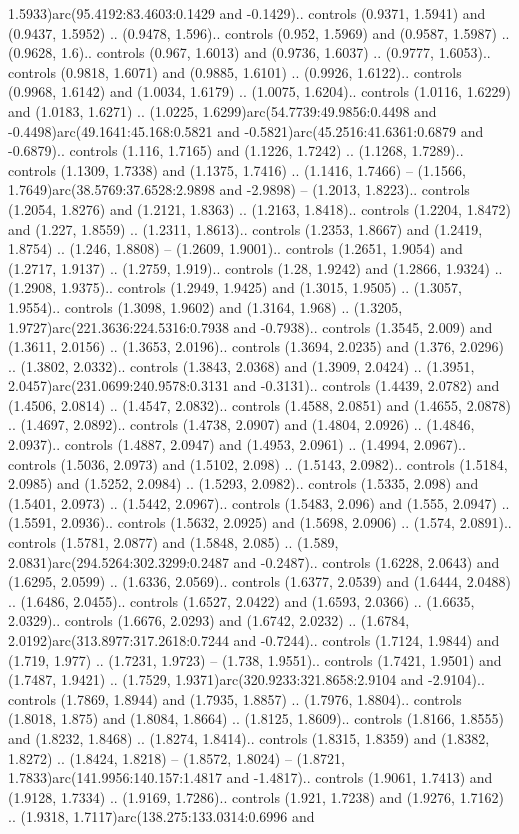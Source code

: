 1.5933)arc(95.4192:83.4603:0.1429 and -0.1429).. controls (0.9371, 1.5941) and (0.9437, 1.5952) .. (0.9478, 1.596).. controls (0.952, 1.5969) and (0.9587, 1.5987) .. (0.9628, 1.6).. controls (0.967, 1.6013) and (0.9736, 1.6037) .. (0.9777, 1.6053).. controls (0.9818, 1.6071) and (0.9885, 1.6101) .. (0.9926, 1.6122).. controls (0.9968, 1.6142) and (1.0034, 1.6179) .. (1.0075, 1.6204).. controls (1.0116, 1.6229) and (1.0183, 1.6271) .. (1.0225, 1.6299)arc(54.7739:49.9856:0.4498 and -0.4498)arc(49.1641:45.168:0.5821 and -0.5821)arc(45.2516:41.6361:0.6879 and -0.6879).. controls (1.116, 1.7165) and (1.1226, 1.7242) .. (1.1268, 1.7289).. controls (1.1309, 1.7338) and (1.1375, 1.7416) .. (1.1416, 1.7466) -- (1.1566, 1.7649)arc(38.5769:37.6528:2.9898 and -2.9898) -- (1.2013, 1.8223).. controls (1.2054, 1.8276) and (1.2121, 1.8363) .. (1.2163, 1.8418).. controls (1.2204, 1.8472) and (1.227, 1.8559) .. (1.2311, 1.8613).. controls (1.2353, 1.8667) and (1.2419, 1.8754) .. (1.246, 1.8808) -- (1.2609, 1.9001).. controls (1.2651, 1.9054) and (1.2717, 1.9137) .. (1.2759, 1.919).. controls (1.28, 1.9242) and (1.2866, 1.9324) .. (1.2908, 1.9375).. controls (1.2949, 1.9425) and (1.3015, 1.9505) .. (1.3057, 1.9554).. controls (1.3098, 1.9602) and (1.3164, 1.968) .. (1.3205, 1.9727)arc(221.3636:224.5316:0.7938 and -0.7938).. controls (1.3545, 2.009) and (1.3611, 2.0156) .. (1.3653, 2.0196).. controls (1.3694, 2.0235) and (1.376, 2.0296) .. (1.3802, 2.0332).. controls (1.3843, 2.0368) and (1.3909, 2.0424) .. (1.3951, 2.0457)arc(231.0699:240.9578:0.3131 and -0.3131).. controls (1.4439, 2.0782) and (1.4506, 2.0814) .. (1.4547, 2.0832).. controls (1.4588, 2.0851) and (1.4655, 2.0878) .. (1.4697, 2.0892).. controls (1.4738, 2.0907) and (1.4804, 2.0926) .. (1.4846, 2.0937).. controls (1.4887, 2.0947) and (1.4953, 2.0961) .. (1.4994, 2.0967).. controls (1.5036, 2.0973) and (1.5102, 2.098) .. (1.5143, 2.0982).. controls (1.5184, 2.0985) and (1.5252, 2.0984) .. (1.5293, 2.0982).. controls (1.5335, 2.098) and (1.5401, 2.0973) .. (1.5442, 2.0967).. controls (1.5483, 2.096) and (1.555, 2.0947) .. (1.5591, 2.0936).. controls (1.5632, 2.0925) and (1.5698, 2.0906) .. (1.574, 2.0891).. controls (1.5781, 2.0877) and (1.5848, 2.085) .. (1.589, 2.0831)arc(294.5264:302.3299:0.2487 and -0.2487).. controls (1.6228, 2.0643) and (1.6295, 2.0599) .. (1.6336, 2.0569).. controls (1.6377, 2.0539) and (1.6444, 2.0488) .. (1.6486, 2.0455).. controls (1.6527, 2.0422) and (1.6593, 2.0366) .. (1.6635, 2.0329).. controls (1.6676, 2.0293) and (1.6742, 2.0232) .. (1.6784, 2.0192)arc(313.8977:317.2618:0.7244 and -0.7244).. controls (1.7124, 1.9844) and (1.719, 1.977) .. (1.7231, 1.9723) -- (1.738, 1.9551).. controls (1.7421, 1.9501) and (1.7487, 1.9421) .. (1.7529, 1.9371)arc(320.9233:321.8658:2.9104 and -2.9104).. controls (1.7869, 1.8944) and (1.7935, 1.8857) .. (1.7976, 1.8804).. controls (1.8018, 1.875) and (1.8084, 1.8664) .. (1.8125, 1.8609).. controls (1.8166, 1.8555) and (1.8232, 1.8468) .. (1.8274, 1.8414).. controls (1.8315, 1.8359) and (1.8382, 1.8272) .. (1.8424, 1.8218) -- (1.8572, 1.8024) -- (1.8721, 1.7833)arc(141.9956:140.157:1.4817 and -1.4817).. controls (1.9061, 1.7413) and (1.9128, 1.7334) .. (1.9169, 1.7286).. controls (1.921, 1.7238) and (1.9276, 1.7162) .. (1.9318, 1.7117)arc(138.275:133.0314:0.6996 and 